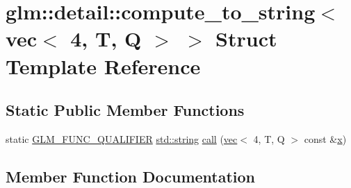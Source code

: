 \hypertarget{structglm_1_1detail_1_1compute__to__string_3_01vec_3_014_00_01_t_00_01_q_01_4_01_4}{}\section{glm\+:\+:detail\+:\+:compute\+\_\+to\+\_\+string$<$ vec$<$ 4, T, Q $>$ $>$ Struct Template Reference}
\label{structglm_1_1detail_1_1compute__to__string_3_01vec_3_014_00_01_t_00_01_q_01_4_01_4}
\subsection*{Static Public Member Functions}
\begin{DoxyCompactItemize}
\item 
static \mbox{\hyperlink{setup_8hpp_a33fdea6f91c5f834105f7415e2a64407}{G\+L\+M\+\_\+\+F\+U\+N\+C\+\_\+\+Q\+U\+A\+L\+I\+F\+I\+ER}} \mbox{\hyperlink{_s_d_l__opengl__glext_8h_ae84541b4f3d8e1ea24ec0f466a8c568b}{std\+::string}} \mbox{\hyperlink{structglm_1_1detail_1_1compute__to__string_3_01vec_3_014_00_01_t_00_01_q_01_4_01_4_a7ad9df3e448b98637f2fa56c1b20817d}{call}} (\mbox{\hyperlink{structglm_1_1vec}{vec}}$<$ 4, T, Q $>$ const \&\mbox{\hyperlink{_s_d_l__opengl_8h_ad0e63d0edcdbd3d79554076bf309fd47}{x}})
\end{DoxyCompactItemize}


\subsection{Member Function Documentation}
\mbox{\label{structglm_1_1detail_1_1compute__to__string_3_01vec_3_014_00_01_t_00_01_q_01_4_01_4_a7ad9df3e448b98637f2fa56c1b20817d}} 
